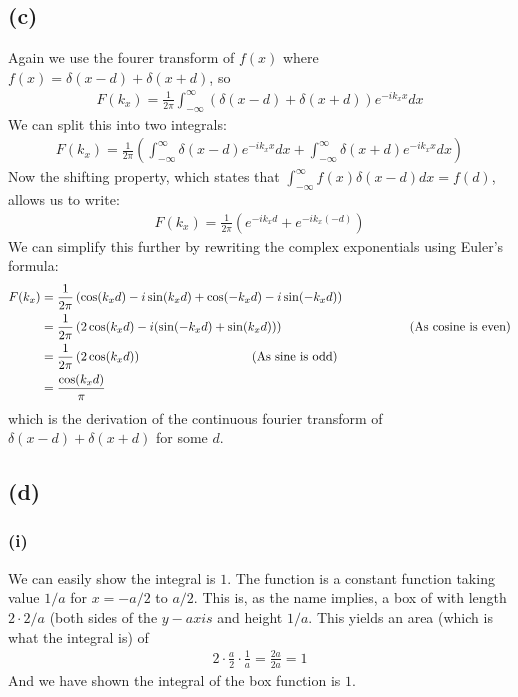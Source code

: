 \documentclass[a4paper]{article}
\newcommand{\comment}[1]{%
  \text{\phantom{(#1)}} \tag{#1}}
\begin{document}
\subsection{(c)}
Again we use the fourer transform of $f(x)$ where $f(x)=\delta(x-d)+\delta(x+d)$, so
\begin{align*}
  F(k_x)=\frac{1}{2\pi}\int_{-\infty}^{\infty}(\delta(x-d)+\delta(x+d))e^{-ik_xx}dx
\end{align*}
We can split this into two integrals:
\begin{align*}
  F(k_x)=\frac{1}{2\pi}\left(\int_{-\infty}^{\infty}\delta(x-d)e^{-ik_xx}dx+\int_{-\infty}^{\infty}\delta(x+d)e^{-ik_xx}dx\right)
\end{align*}
Now the shifting property, which states that $\int_{-\infty}^{\infty}f(x)\delta(x-d)dx=f(d)$, allows us to write:
\begin{align*}
  F(k_x)=\frac{1}{2\pi}\left(e^{-ik_xd}+e^{-ik_x(-d)}\right)
\end{align*}
We can simplify this further by rewriting the complex exponentials using Euler's formula:
\begin{align*}
  F(k_x)&= \frac{1}{2\pi}\left(\cos(k_xd)-i\sin(k_xd)+\cos(-k_xd)-i\sin(-k_xd)\right) \\
        &= \frac{1}{2\pi}\left(2\cos(k_xd)-i(\sin(-k_xd)+\sin(k_xd))\right) \comment{As cosine is even} \\
        &= \frac{1}{2\pi}\left(2\cos(k_xd)\right) \comment{As sine is odd} \\
        &= \frac{\cos(k_xd)}{\pi}
\end{align*}
which is the derivation of the continuous fourier transform of $\delta(x-d)+\delta(x+d)$ for some $d$.

\subsection{(d)}
\subsubsection{(i)}
We can easily show the integral is $1$. The function is a constant function taking value $1/a$ for $x=-a/2$ to $a/2$. This is, as the name implies, a box of with length $2\cdot 2/a$ (both sides of the $y-axis$ and height $1/a$. This yields an area (which is what the integral is) of
\begin{align*}
  2\cdot \frac{a}{2} \cdot \frac{1}{a} = \frac{2a}{2a} = 1
\end{align*}
And we have shown the integral of the box function is $1$.
\end{document}
